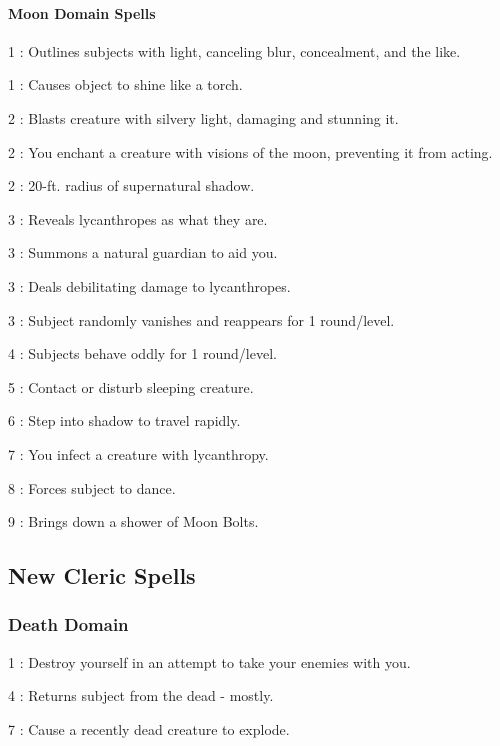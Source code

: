 \paragraph{Moon Domain Spells}
\begin{list}{}{\leftmargin=1em}
 \item[1] : Outlines subjects with light, canceling blur, concealment, and the like.
 \item[1] : Causes object to shine like a torch.
 \item[2] : Blasts creature with silvery light, damaging and stunning it.
 \item[2] : You enchant a creature with visions of the moon, preventing it from acting.
 \item[2] : 20-ft. radius of supernatural shadow.
 \item[3] : Reveals lycanthropes as what they are.
 \item[3] : Summons a natural guardian to aid you.
 \item[3] : Deals debilitating damage to lycanthropes.
 \item[3] : Subject randomly vanishes and reappears for 1 round/level.
 \item[4] : Subjects behave oddly for 1 round/level.
 \item[5] : Contact or disturb sleeping creature.
 \item[6] : Step into shadow to travel rapidly.
 \item[7] : You infect a creature with lycanthropy.
 \item[8] : Forces subject to dance.
 \item[9] : Brings down a shower of Moon Bolts.
\end{list}

\subsection{New Cleric Spells}
\subsubsection{Death Domain}
\begin{list}{}{\leftmargin=1em}
 \item[1] : Destroy yourself in an attempt to take your enemies with you.
 \item[4] : Returns subject from the dead - mostly.
 \item[7] : Cause a recently dead creature to explode.
\end{list}
